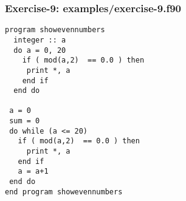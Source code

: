\documentclass[xcolor=dvipsnames,dvip,notes=show,table]{beamer}
\begin{document}
\begin{frame}[fragile]
\frametitle{Exercise-9: examples/exercise-9.f90}
\scriptsize
\begin{lstlisting}
program showevennumbers
  integer :: a
  do a = 0, 20
    if ( mod(a,2)  == 0.0 ) then 
	 print *, a 
    end if	
  end do

 a = 0
 sum = 0
 do while (a <= 20) 
   if ( mod(a,2)  == 0.0 ) then 
     print *, a 
   end if	
   a = a+1
 end do
end program showevennumbers
\end{lstlisting}
\end{frame}



% 
% 
% 
% 
% 
% 
% 
%  
% 
% 
% 
\end{document}
